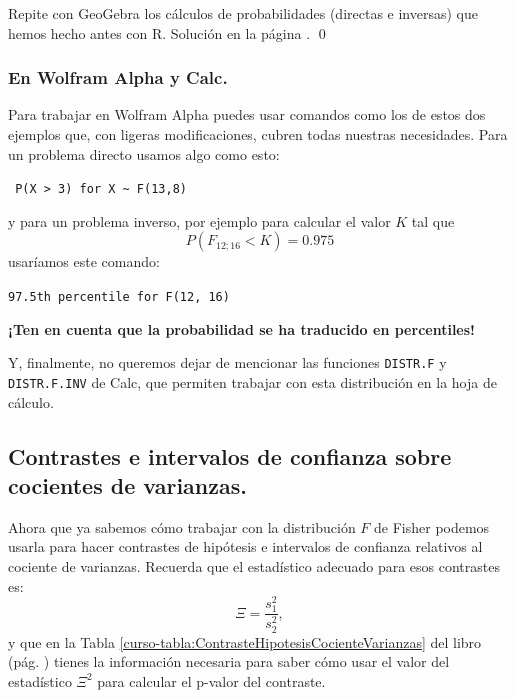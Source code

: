\documentclass[10pt,a4paper]{article}\usepackage[]{graphicx}\usepackage[]{color}
\newcounter {cont01}
\begin{document}
\begin{ejercicio}
\label{tut09:ejercicio03}
Repite con GeoGebra los cálculos de probabilidades (directas e inversas) que hemos hecho antes con R.
Solución en la página \pageref{tut09:ejercicio03:sol}.
\qed
\end{ejercicio}


\subsubsection*{En Wolfram Alpha y Calc.}

Para trabajar en Wolfram Alpha puedes usar comandos como los de estos dos ejemplos que, con ligeras modificaciones, cubren todas nuestras necesidades. Para un problema directo usamos algo  como esto:
\begin{center}
\verb# P(X > 3) for X ~ F(13,8)#
\end{center}
y para un problema inverso, por ejemplo para calcular el valor $K$ tal que
\[ P( F_{12;16} < K) = 0.975\]
usaríamos este comando:
\begin{center}
  {\tt 97.5th percentile  for F(12, 16)}
\end{center}
{\bf ¡Ten en cuenta que la probabilidad se ha traducido en percentiles!}

Y, finalmente, no queremos dejar de mencionar las funciones {\tt DISTR.F} y {\tt DISTR.F.INV} de Calc, que permiten trabajar con esta distribución en la hoja de cálculo.


\subsection{Contrastes e intervalos de confianza sobre cocientes de varianzas.}

Ahora que ya sabemos cómo trabajar con la distribución $F$ de Fisher podemos usarla para hacer contrastes de hipótesis e intervalos de confianza relativos al cociente de varianzas. Recuerda que el estadístico adecuado para esos contrastes es:
\[\Xi = \dfrac{s_1^2}{s_2 ^2},\]
y que en la Tabla \ref{curso-tabla:ContrasteHipotesisCocienteVarianzas} del libro (pág. \pageref{curso-tabla:ContrasteHipotesisCocienteVarianzas}) tienes la información necesaria para saber cómo usar el valor del estadístico $\Xi^2$ para calcular el p-valor del contraste.
\end{document}
